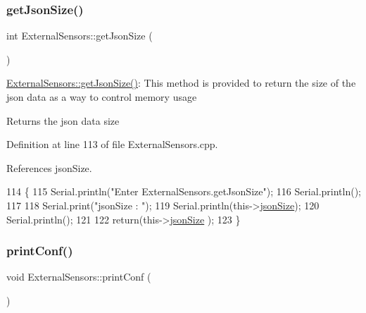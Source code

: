 \mbox{\label{classExternalSensors_a8e3a93efa8f5a0477f300e26084b6625}} 
\subsubsection{\texorpdfstring{get\+Json\+Size()}{getJsonSize()}}
{\footnotesize\ttfamily int External\+Sensors\+::get\+Json\+Size (\begin{DoxyParamCaption}{ }\end{DoxyParamCaption})}

\hyperlink{classExternalSensors_a8e3a93efa8f5a0477f300e26084b6625}{External\+Sensors\+::get\+Json\+Size()}\+: This method is provided to return the size of the json data as a way to control memory usage

\begin{DoxyReturn}{Returns}
the json data size 
\end{DoxyReturn}


Definition at line 113 of file External\+Sensors.\+cpp.



References json\+Size.


\begin{DoxyCode}
114 \{
115     Serial.println(\textcolor{stringliteral}{"Enter ExternalSensors.getJsonSize"});
116     Serial.println();
117     
118     Serial.print(\textcolor{stringliteral}{"jsonSize : "});
119     Serial.println(this->\hyperlink{classExternalSensors_acacea86d74d967b57fcff282d26cff57}{jsonSize});
120     Serial.println();
121 
122     \textcolor{keywordflow}{return}(this->\hyperlink{classExternalSensors_acacea86d74d967b57fcff282d26cff57}{jsonSize} );
123 \}
\end{DoxyCode}
\mbox{\label{classExternalSensors_a78c2bf55084435dd51d3c559b2d3c6f3}} 
\subsubsection{\texorpdfstring{print\+Conf()}{printConf()}}
{\footnotesize\ttfamily void External\+Sensors\+::print\+Conf (\begin{DoxyParamCaption}{ }\end{DoxyParamCaption})}

